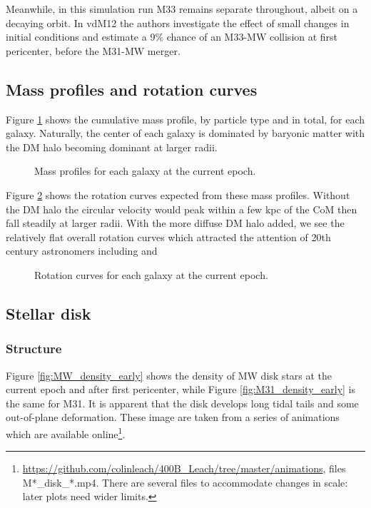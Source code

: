 \documentclass[twocolumn]{aastex63}
\begin{document}
Meanwhile, in this simulation run M33 remains separate throughout, albeit on a decaying orbit. In vdM12 the authors investigate the effect of small changes in initial conditions and estimate a 9\% chance of an M33-MW collision at first pericenter, before the M31-MW merger.

\subsection{Mass profiles and rotation curves}

Figure \ref{fig:massprof0} shows the cumulative mass profile, by particle type and in total, for each galaxy. Naturally, the center of each galaxy is dominated by baryonic matter with the DM halo becoming dominant at larger radii.
\begin{figure}[bht!]
	\caption{Mass profiles for each galaxy at the current epoch.
		\label{fig:massprof0}}
\end{figure}

Figure \ref{fig:rotcurve0} shows the rotation curves expected from these mass profiles. Without the DM halo the circular velocity would peak within a few kpc of the CoM then fall steadily at larger radii. With the more diffuse DM halo added, we see the relatively flat overall rotation curves which attracted the attention of 20th century astronomers including \citet{zwicky_rotverschiebung_1933} and \citet{rubin_rotation_1970}

\begin{figure}[!bht!]
	\caption{Rotation curves for each galaxy at the current epoch.
		\label{fig:rotcurve0}}
\end{figure}

\subsection{Stellar disk}

\subsubsection{Structure}

Figure \ref{fig:MW_density_early} shows the density of MW disk stars at the current epoch and after first pericenter, while Figure \ref{fig:M31_density_early} is the same for M31. It is apparent that the disk develops long tidal tails and some out-of-plane deformation. These image are taken from a series of animations which are available online\footnote{\url{https://github.com/colinleach/400B_Leach/tree/master/animations}, files M*\_disk\_*.mp4. There are several files to accommodate changes in scale: later plots need wider limits.}.
\end{document}
